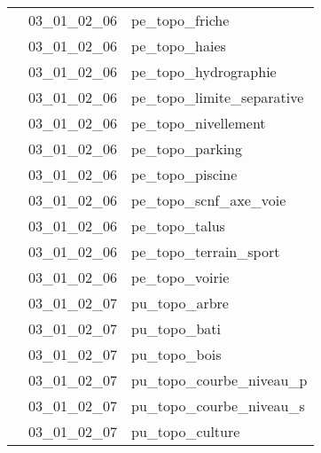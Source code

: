 \documentclass[12pt,titlepage]{book}
\begin{document}
\begin{supertabular}{|p{10cm}|c|p{15cm}|}
                    & 03\_01\_02\_06 & pe\_topo\_friche\\


                    & 03\_01\_02\_06 & pe\_topo\_haies\\


                    & 03\_01\_02\_06 & pe\_topo\_hydrographie\\


                    & 03\_01\_02\_06 & pe\_topo\_limite\_separative\\


                    & 03\_01\_02\_06 & pe\_topo\_nivellement\\


                    & 03\_01\_02\_06 & pe\_topo\_parking\\


                    & 03\_01\_02\_06 & pe\_topo\_piscine\\


                    & 03\_01\_02\_06 & pe\_topo\_scnf\_axe\_voie\\


                    & 03\_01\_02\_06 & pe\_topo\_talus\\


                    & 03\_01\_02\_06 & pe\_topo\_terrain\_sport\\


                    & 03\_01\_02\_06 & pe\_topo\_voirie\\


                    & 03\_01\_02\_07 & pu\_topo\_arbre\\


                    & 03\_01\_02\_07 & pu\_topo\_bati\\


                    & 03\_01\_02\_07 & pu\_topo\_bois\\


                    & 03\_01\_02\_07 & pu\_topo\_courbe\_niveau\_p\\


                    & 03\_01\_02\_07 & pu\_topo\_courbe\_niveau\_s\\


                    & 03\_01\_02\_07 & pu\_topo\_culture\\



\end{supertabular}
\end{document}

